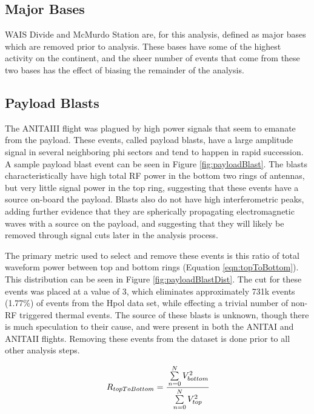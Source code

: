 	\subsection{Major Bases}
		WAIS Divide and McMurdo Station are, for this analysis, defined as major bases which are removed prior to analysis.  These bases have some of the highest activity on the continent, and the sheer number of events that come from these two bases has the effect of biasing the remainder of the analysis.

	\subsection{Payload Blasts}
		The ANITAIII flight was plagued by high power signals that seem to emanate from the payload.  These events, called payload blasts, have a large amplitude signal in several neighboring phi sectors and tend to happen in rapid succession.  A sample payload blast event can be seen in Figure \ref{fig:payloadBlast}.  The blasts characteristically have high total RF power in the bottom two rings of antennas, but very little signal power in the top ring, suggesting that these events have a source on-board the payload.  Blasts also do not have high interferometric peaks, adding further evidence that they are spherically propagating electromagnetic waves with a source on the payload, and suggesting that they will likely be removed through signal cuts later in the analysis process.
		
		The primary metric used to select and remove these events is this ratio of total waveform power between top and bottom rings (Equation \ref{eqn:topToBottom}). This distribution can be seen in Figure \ref{fig:payloadBlastDist}.  The cut for these events was placed at a value of 3, which eliminates approximately 731k  events (1.77\%) of events from the Hpol data set, while effecting a trivial number of non-RF triggered thermal events.  The source of these blasts is unknown, though there is much speculation to their cause, and were present in both the ANITAI and ANITAII flights.  Removing these events from the dataset is done prior to all other analysis steps.  
		
\begin{equation}
	R_{topToBottom} = \cfrac{\sum\limits_{n=0}^{N} V^{2}_{bottom}}{\sum\limits_{n=0}^{N} V^{2}_{top}}
	\label{eqn:topToBottom}
\end{equation}
		
